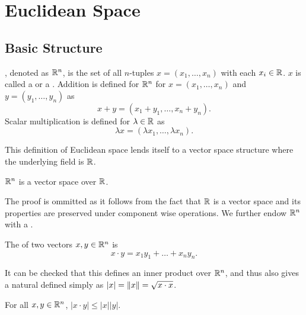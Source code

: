 \documentclass{subfile}
\begin{document}
\chapter{Euclidean Space}

\section{Basic Structure}

\begin{definition}
    , denoted as $\mathbb{R}^n$, is the set of all $n$-tuples $x = (x_1, \ldots, x_n)$ with each $x_i \in \mathbb{R}$. $x$ is called a  or a . Addition is defined for $\mathbb{R}^n$ for $x = (x_1, \ldots, x_n)$ and $y = (y_1, \ldots, y_n)$ as
    \[
        x+y = (x_1 + y_1, \ldots, x_n + y_n) 
    .\]
    Scalar multiplication is defined for $\lambda \in \mathbb{R}$ as
    \[
        \lambda x = (\lambda x_1, \ldots, \lambda x_n)
    .\]
\end{definition}

This definition of Euclidean space lends itself to a vector space structure where the underlying field is $\mathbb{R}$. 

\begin{theorem}
    $\mathbb{R}^n$ is a vector space over $\mathbb{R}$.
\end{theorem}

The proof is ommitted as it follows from the fact that $\mathbb{R}$ is a vector space and its properties are preserved under component wise operations. We further endow $\mathbb{R}^n$ with a .

\begin{definition}
    The  of two vectors $x,y \in \mathbb{R}^n$ is
    \[
        x \cdot y = x_1 y_1 + \ldots + x_n y_n
    .\]
\end{definition}

It can be checked that this defines an inner product over $\mathbb{R}^n$, and thus also gives a natural  defined simply as $|x| = \norm{x} = \sqrt{x \cdot x}$.

\begin{theorem}
    \label{thm:cauchyschwarz}
    For all $x,y \in \mathbb{R}^n$, $|x \cdot y| \leq |x| |y|$.
\end{theorem}
\end{document}

